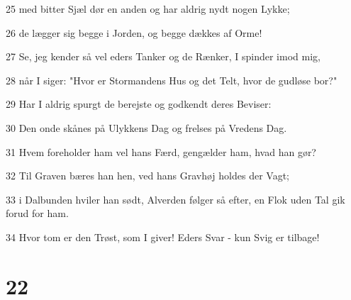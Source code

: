 \par 25 med bitter Sjæl dør en anden og har aldrig nydt nogen Lykke;
\par 26 de lægger sig begge i Jorden, og begge dækkes af Orme!
\par 27 Se, jeg kender så vel eders Tanker og de Rænker, I spinder imod mig,
\par 28 når I siger: "Hvor er Stormandens Hus og det Telt, hvor de gudløse bor?"
\par 29 Har I aldrig spurgt de berejste og godkendt deres Beviser:
\par 30 Den onde skånes på Ulykkens Dag og frelses på Vredens Dag.
\par 31 Hvem foreholder ham vel hans Færd, gengælder ham, hvad han gør?
\par 32 Til Graven bæres han hen, ved hans Gravhøj holdes der Vagt;
\par 33 i Dalbunden hviler han sødt, Alverden følger så efter, en Flok uden Tal gik forud for ham.
\par 34 Hvor tom er den Trøst, som I giver! Eders Svar - kun Svig er tilbage!

\chapter{22}

